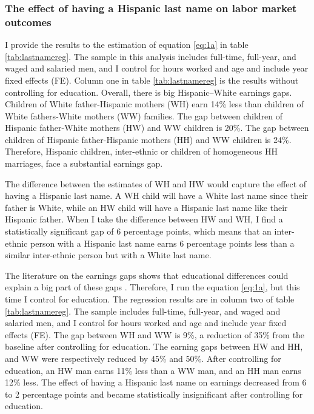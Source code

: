 \documentclass[12pt, fullpage]{article}
\begin{document}
\subsubsection{The effect of having a Hispanic last name on labor market outcomes}

I provide the results to the estimation of equation \ref{eq:1a} in table \ref{tab:lastnamereg}. The sample in this analysis includes full-time, full-year, and waged and salaried men, and I control for hours worked and age and include year fixed effects (FE). Column one in table \ref{tab:lastnamereg} is the results without controlling for education. Overall, there is big Hispanic--White earnings gaps. Children of White father-Hispanic mothers (WH) earn 14\% less than children of White fathers-White mothers (WW) families. The gap between children of Hispanic father-White mothers (HW) and WW children is 20\%. The gap between children of Hispanic father-Hispanic mothers (HH) and WW children is 24\%. Therefore, Hispanic children, inter-ethnic or children of homogeneous HH marriages, face a substantial earnings gap.

The difference between the estimates of WH and HW would capture the effect of having a Hispanic last name. A WH child will have a White last name since their father is White, while an HW child will have a Hispanic last name like their Hispanic father. When I take the difference between HW and WH, I find a statistically significant gap of 6 percentage points, which means that an inter-ethnic person with a Hispanic last name earns 6 percentage points less than a similar inter-ethnic person but with a White last name.

The literature on the earnings gaps shows that educational differences could explain a big part of these gaps \citep{duncan2006hispanics, duncan2017complexity, duncan2018identifying, duncan2020new}. Therefore, I run the equation \ref{eq:1a}, but this time I control for education. The regression results are in column two of table \ref{tab:lastnamereg}. The sample includes full-time, full-year, and waged and salaried men, and I control for hours worked and age and include year fixed effects (FE). The gap between WH and WW is 9\%, a reduction of 35\% from the baseline after controlling for education. The earning gaps between HW and HH, and WW were respectively reduced by 45\% and 50\%. After controlling for education, an HW man earns 11\% less than a WW man, and an HH man earns 12\% less. The effect of having a Hispanic last name on earnings decreased from 6 to 2 percentage points and became statistically insignificant after controlling for education.
\end{document}
